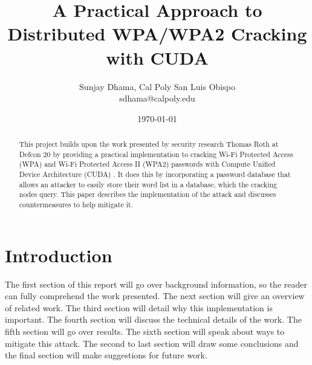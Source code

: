 \documentclass[12pt]{article}
\begin{document}
\setlength{\parindent}{1cm}
\title{\vfill A Practical Approach to Distributed WPA/WPA2 Cracking with CUDA} 


\author{Sunjay Dhama, Cal Poly San Luis Obispo\vspace{12pt} \\
sdhama@calpoly.edu\vspace{12pt} \\
}
\date{\today}

\maketitle
\vfill
\begin{abstract}
This project builds upon the work presented by security research Thomas Roth at Defcon 20 by providing a practical implementation to cracking Wi-Fi Protected Access (WPA) and Wi-Fi Protected Access II (WPA2) passwords with Compute Unified Device Architecture (CUDA) \cite{roth}. It does this by incorporating a password database that allows an attacker to easily store their word list in a database, which the cracking nodes query.
This paper describes the implementation of the attack and discusses countermeasures to help mitigate it. 
\end{abstract}

\thispagestyle{empty} 
\newpage
\thispagestyle{empty} %
\tableofcontents
\newpage
\setcounter{page}{1}
\section{Introduction}
\indent The first section of this report will go over background information, so the reader can fully comprehend the work presented. The next section will give an overview of related work. The third section will detail why this implementation is important. The fourth section will discuss the technical details of the work. The fifth section will go over results. The sixth section will speak about ways to mitigate this attack. The second to last section will draw some conclusions and the final section will make suggestions for future work.
\end{document}
